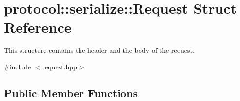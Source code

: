 \hypertarget{structprotocol_1_1serialize_1_1_request}{}\section{protocol\+:\+:serialize\+:\+:Request Struct Reference}
\label{structprotocol_1_1serialize_1_1_request}


This structure contains the header and the body of the request.  




{\ttfamily \#include $<$request.\+hpp$>$}

\subsection*{Public Member Functions}
